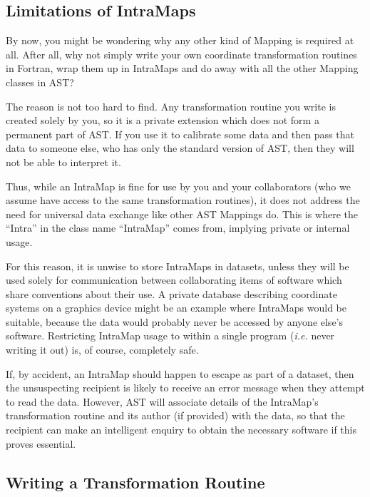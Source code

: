 \documentclass[twoside,11pt]{article}
\newcommand{\htmlref}[2]{#1}
\begin{document}
\subsection{\label{ss:intramaplimitations}Limitations of IntraMaps}

By now, you might be wondering why any other kind of \htmlref{Mapping}{Mapping} is
required at all. After all, why not simply write your own coordinate
transformation routines in Fortran, wrap them up in IntraMaps and do
away with all the other Mapping classes in AST?

The reason is not too hard to find. Any transformation routine you
write is created solely by you, so it is a private extension which
does not form a permanent part of AST. If you use it to calibrate some
data and then pass that data to someone else, who has only the
standard version of AST, then they will not be able to interpret it.

Thus, while an \htmlref{IntraMap}{IntraMap} is fine for use by you and your collaborators
(who we assume have access to the same transformation routines), it
does not address the need for universal data exchange like other AST
Mappings do. This is where the ``Intra'' in the class name
``IntraMap'' comes from, implying private or internal usage.

For this reason, it is unwise to store IntraMaps in datasets, unless
they will be used solely for communication between collaborating items
of software which share conventions about their use.  A private
database describing coordinate systems on a graphics device might be
an example where IntraMaps would be suitable, because the data would
probably never be accessed by anyone else's software. Restricting
IntraMap usage to within a single program ({\em{i.e.}} never writing
it out) is, of course, completely safe.

If, by accident, an IntraMap should happen to escape as part of a
dataset, then the unsuspecting recipient is likely to receive an error
message when they attempt to read the data. However, AST will
associate details of the IntraMap's transformation routine and its
author (if provided) with the data, so that the recipient can make an
intelligent enquiry to obtain the necessary software if this proves
essential.

\subsection{\label{ss:transformationfunctions}Writing a Transformation Routine}
\end{document}

